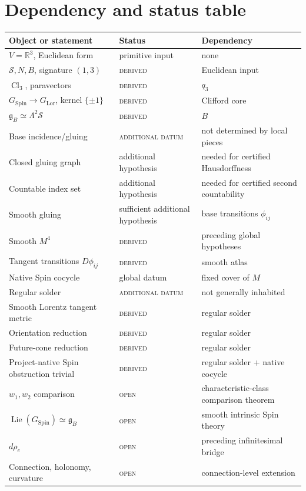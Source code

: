 \documentclass[11pt,a4paper]{article}
\theoremstyle{definition}
\theoremstyle{remark}
\newcommand{\R}{\mathbb{R}}
\newcommand{\Smodel}{\mathcal{S}}
\newcommand{\Cl}{\operatorname{Cl}}
\newcommand{\SpinG}{G_{\mathrm{Spin}}}
\newcommand{\LorG}{G_{\mathrm{Lor}}}
\newcommand{\gB}{\mathfrak{g}_{B}}
\newcommand{\statusderived}{\textsc{derived}}
\newcommand{\statusdatum}{\textsc{additional datum}}
\newcommand{\statusopen}{\textsc{open}}
\begin{document}
\appendix
\clearpage
\section{Dependency and status table}
\label{app:status}

\begin{center}
\small
\begin{tabular}{>{\raggedright\arraybackslash}p{}
                >{\raggedright\arraybackslash}p{}
                >{\raggedright\arraybackslash}p{}}
\toprule
Object or statement & Status & Dependency \\
\midrule
\(V=\R^{3}\), Euclidean form & primitive input & none \\
\(\Smodel,N,B\), signature \((1,3)\) & \statusderived & Euclidean input \\
\(\Cl_{3}\), paravectors & \statusderived & \(q_{3}\) \\
\(\SpinG\to\LorG\), kernel \(\{\pm1\}\) & \statusderived & Clifford core \\
\(\gB\simeq\Lambda^{2}\Smodel\) & \statusderived & \(B\) \\
Base incidence/gluing & \statusdatum & not determined by local pieces \\
Closed gluing graph & additional hypothesis & needed for certified Hausdorffness \\
Countable index set & additional hypothesis & needed for certified second countability \\
Smooth gluing & sufficient additional hypothesis & base transitions \(\phi_{ij}\) \\
Smooth \(M^{4}\) & \statusderived & preceding global hypotheses \\
Tangent transitions \(D\phi_{ij}\) & \statusderived & smooth atlas \\
Native Spin cocycle & global datum & fixed cover of \(M\) \\
Regular solder & \statusdatum & not generally inhabited \\
Smooth Lorentz tangent metric & \statusderived & regular solder \\
Orientation reduction & \statusderived & regular solder \\
Future-cone reduction & \statusderived & regular solder \\
Project-native Spin obstruction trivial & \statusderived & regular solder + native cocycle \\
\(w_1,w_2\) comparison & \statusopen & characteristic-class comparison theorem \\
\(\operatorname{Lie}(\SpinG)\simeq\gB\) & \statusopen & smooth intrinsic Spin theory \\
\(d\rho_e\) & \statusopen & preceding infinitesimal bridge \\
Connection, holonomy, curvature & \statusopen & connection-level extension \\
\bottomrule
\end{tabular}
\end{center}
\end{document}
